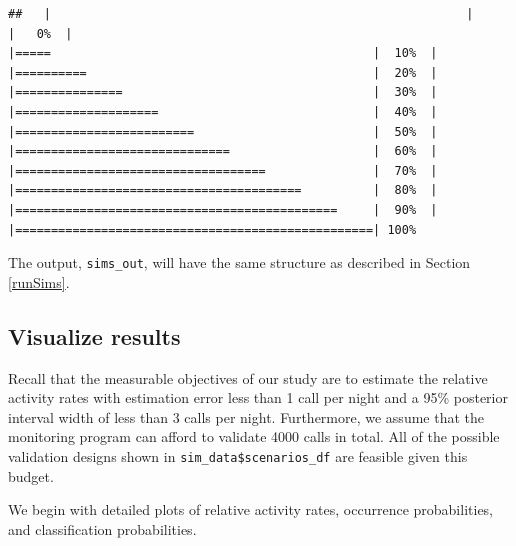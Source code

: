 \documentclass[
]{article}
\begin{document}
\begin{verbatim}
##   |                                                          |                                                  |   0%  |                                                          |=====                                             |  10%  |                                                          |==========                                        |  20%  |                                                          |===============                                   |  30%  |                                                          |====================                              |  40%  |                                                          |=========================                         |  50%  |                                                          |==============================                    |  60%  |                                                          |===================================               |  70%  |                                                          |========================================          |  80%  |                                                          |=============================================     |  90%  |                                                          |==================================================| 100%
\end{verbatim}

\linespread{1}

The output, \texttt{sims\_out}, will have the same structure as described in Section \ref{runSims}.

\subsection{\texorpdfstring{Visualize results \label{vizbyspp}}{Visualize results }}\label{visualize-results}

Recall that the measurable objectives of our study are to estimate the relative activity rates with estimation error less than 1 call per night and a 95\% posterior interval width of less than 3 calls per night. Furthermore, we assume that the monitoring program can afford to validate 4000 calls in total. All of the possible validation designs shown in \texttt{sim\_data\$scenarios\_df} are feasible given this budget.

We begin with detailed plots of relative activity rates, occurrence probabilities, and classification probabilities.

\linespread{1}
\end{document}
